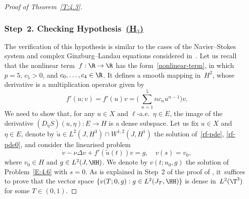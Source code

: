 \begin{proof}[Proof of Theorem~\ref{T:4.3}]
\subsubsection*{Step~2. Checking Hypothesis~\protect\hyperlink{H3}{\rm(H$_3$)}}
The verification of this hypothesis is similar to the cases of the Navier--Stokes system and complex Ginzburg--Landau equations considered in~\cite[\S 4]{KNS-2020}. Let us recall that the nonlinear term~$f:\R\to\R$ has the form~\eqref{nonlinear-term}, in which $p=5$, $c_5>0$, and $c_0,\dots,c_4\in\R$. It defines a smooth mapping in~$H^2$, whose derivative is a multiplication operator given by
\[
f'(u;v)=f'(u)v=\biggl(\,\sum_{n=1}^5 n c_n u^{n-1}\biggr)v.
\]
We need to show that, for any $u\in X$ and $\ell$-a.e.~$\eta\in E$, the image of the derivative $(D_\eta S)(u,\eta):E\to H$ is a dense subspace. Let us fix $u\in X$ and $\eta\in E$, denote by $\tilde u\in L^2(J,H^3)\cap W^{1,2}(J,H^1)$ the solution of~\eqref{rf-pde}, \eqref{rf-pde0}, and consider the linearised problem\vspace*{-3pt}
\begin{equation} \label{E:4.6}
\dot v-\nu \Delta v+f'(\tilde u(t))v=g, \quad v(s)=v_0,
\end{equation}
where $v_0\in H$ and $g\in L^2(J,\HH)$. We denote by $v(t;u_0,g)$ the solution of Problem~\eqref{E:4.6} with $s=0$. As is explained in Step~2 of the proof of \cite[Th.\,4.7]{KNS-2020}, it~suffices to prove that the vector space $\{v(T;0,g): g\in L^2(J_T,\HH)\}$ is dense in~$L^2(\T^3)$ for some $T\in(0,1)$.


\end{proof}
